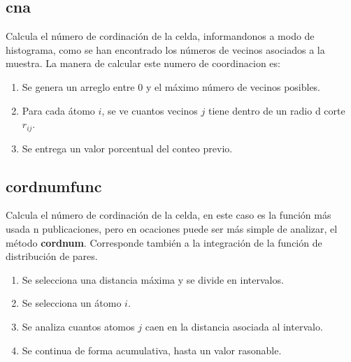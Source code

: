 
\subsection{cna}
Calcula el n\'umero de cordinaci\'on de la celda, informandonos a modo de histograma, como se han encontrado los n\'umeros de vecinos asociados a la muestra. La manera de calcular este numero de coordinacion es:

\begin{enumerate}
 \item Se genera un arreglo entre 0 y el m\'aximo n\'umero de vecinos posibles.
 \item Para cada \'atomo $i$, se ve cuantos vecinos $j$ tiene dentro de un radio d corte $r_{ij}$.
 \item Se entrega un valor porcentual del conteo previo.
\end{enumerate}


\subsection{cordnumfunc}
Calcula el n\'umero de cordinaci\'on de la celda, en este caso es la funci\'on m\'as usada n publicaciones, pero en ocaciones puede ser m\'as simple de analizar, el m\'etodo \textbf{cordnum}. Corresponde tambi\'en a la integraci\'on de la funci\'on de distribuci\'on de pares.
\begin{enumerate}
 \item Se selecciona una distancia m\'axima y se divide en intervalos.
 \item Se selecciona un \'atomo $i$.
 \item Se analiza cuantos atomos $j$ caen en la distancia asociada al intervalo.
 \item Se continua de forma acumulativa, hasta un valor rasonable.
\end{enumerate}

